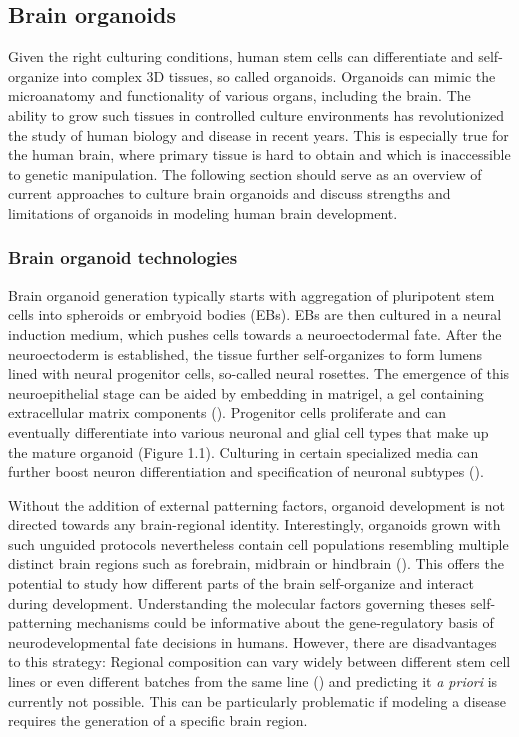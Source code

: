 \clearpage


\subsection{Brain organoids}

Given the right culturing conditions, human stem cells can differentiate and self-organize into complex 3D tissues, so called organoids. Organoids can mimic the microanatomy and functionality of various organs, including the brain. The ability to grow such tissues in controlled culture environments has revolutionized the study of human biology and disease in recent years. This is especially true for the human brain, where primary tissue is hard to obtain and which is inaccessible to genetic manipulation. The following section should serve as an overview of current approaches to culture brain organoids and discuss strengths and limitations of organoids in modeling human brain development.


\subsubsection{Brain organoid technologies}

Brain organoid generation typically starts with aggregation of pluripotent stem cells into spheroids or embryoid bodies (EBs). EBs are then cultured in a neural induction medium, which pushes cells towards a neuroectodermal fate. After the neuroectoderm is established, the tissue further self-organizes to form lumens lined with neural progenitor cells, so-called neural rosettes. The emergence of this neuroepithelial stage can be aided by embedding in matrigel, a gel containing extracellular matrix components (\cite{lancaster_cerebral_2013,eiraku_self-organizing_2011}). Progenitor cells proliferate and can eventually differentiate into various neuronal and glial cell types that make up the mature organoid (Figure 1.1). Culturing in certain specialized media can further boost neuron differentiation and specification of neuronal subtypes (\cite{bardy_neuronal_2015}). 


Without the addition of external patterning factors, organoid development is not directed towards any brain-regional identity. Interestingly, organoids grown with such unguided protocols nevertheless contain cell populations resembling multiple distinct brain regions such as forebrain, midbrain or hindbrain (\cite{lancaster_cerebral_2013,kadoshima_self-organization_2013}). This offers the potential to study how different parts of the brain self-organize and interact during development. Understanding the molecular factors governing theses self-patterning mechanisms could be informative about the gene-regulatory basis of neurodevelopmental fate decisions in humans. However, there are disadvantages to this strategy: Regional composition can vary widely between different stem cell lines or even different batches from the same line (\cite{kanton_organoid_2019}) and predicting it \textit{a priori} is currently not possible. This can be particularly problematic if modeling a disease requires the generation of a specific brain region.

